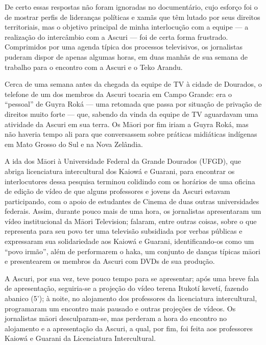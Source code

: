 \documentclass{article}
\begin{document}
De certo essas respostas n\~ao foram ignoradas no document\'ario, cujo
esfor\c{c}o foi o de mostrar perfis de lideran\c{c}as pol\'iticas e
xam\~as que t\^em lutado por seus direitos territoriais, mas o objetivo
principal de minha interlocu\c{c}\~ao com a equipe --- a
realiza\c{c}\~ao do interc\^ambio com a Ascuri --- foi de certa forma
frustrado. Comprimidos por uma agenda t\'ipica dos processos
televisivos, os jornalistas puderam dispor de apenas algumas horas, em
duas manh\~as de sua semana de trabalho para o encontro com a Ascuri e
o Teko Arandu.

Cerca de uma semana antes da chegada da equipe de TV \`a cidade de
Dourados, o telefone de um dos membros da Ascuri tocaria em Campo
Grande: era o {\textquotedblleft}pessoal{\textquotedblright} de Guyra
Rok\'a --- uma retomada que passa por situa\c{c}\~ao de priva\c{c}\~ao
de direitos muito forte --- que, sabendo da vinda da equipe de TV
aguardavam uma atividade da Ascuri em sua terra. Os M\=aori por fim
iriam a Guyra Rok\'a, mas n\~ao haveria tempo ali para que conversassem
sobre pr\'aticas midi\'aticas ind\'igenas em Mato Grosso do Sul e na
Nova Zel\^andia. 

A ida dos M\=aori \`a Universidade Federal da Grande Dourados (UFGD),
que abriga licenciatura intercultural dos Kaiow\'a e Guarani, para
encontrar os interlocutores dessa pesquisa terminou colidindo com os
hor\'arios de uma oficina de edi\c{c}\~ao de v\'ideo de que alguns
professores e jovens da Ascuri estavam participando, com o apoio de
estudantes de Cinema de duas outras universidades federais. Assim,
durante pouco mais de uma hora, os jornalistas apresentaram um v\'ideo
institucional da M\=aori Television; falaram, entre outras coisas,
sobre o que representa para seu povo ter uma televis\~ao subsidiada por
verbas p\'ublicas e expressaram sua solidariedade aos Kaiow\'a e
Guarani, identificando-os como um {\textquotedblleft}povo
irm\~ao{\textquotedblright}, al\'em de performarem o haka, um conjunto
de dan\c{c}as t\'ipicas m\=aori e presentearem os membros da Ascuri com
DVDs de sua produ\c{c}\~ao. 

A Ascuri, por sua vez, teve pouco tempo para se apresentar; ap\'os uma
breve fala de apresenta\c{c}\~ao, seguiria-se a proje\c{c}\~ao do
v\'ideo terena Itukot\'i kevet\'i, fazendo abanico
(5{\textquoteright}); \`a noite, no alojamento dos professores da
licenciatura intercultural, programaram um encontro mais pausado e
outras proje\c{c}\~oes de v\'ideos. Os jornalistas m\=aori
desculparam-se, mas perderam a hora do encontro no alojamento e a
apresenta\c{c}\~ao da Ascuri, a qual, por fim, foi feita aos
professores Kaiow\'a e Guarani da Licenciatura Intercultural. 
\end{document}
